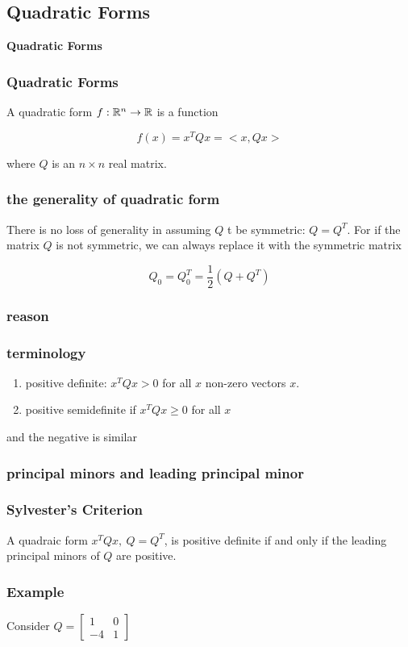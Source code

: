\begin{frame}
	\section{Quadratic Forms}
	\begin{center}
	\textbf{Quadratic Forms}
	\end{center}
\end{frame}

\begin{frame}
	\frametitle{Quadratic Forms}
	A quadratic form $f:\mathbb{R}^n \rightarrow \mathbb{R}$ is a function

	$$f(x) = x^TQx = <x,Qx>$$

	where $Q$ is an $n \times n$ real matrix.
\end{frame}

\begin{frame}
	\frametitle{the generality of quadratic form}
	There is no loss of generality in assuming $Q$ t be symmetric: $Q = Q^T$. For if the matrix $Q$ is not symmetric, we can always replace it with the symmetric matrix

	$$Q_0 = Q_0^T = \dfrac{1}{2}\left( Q + Q^T \right)$$
\end{frame}

\begin{frame}
	\frametitle{reason}
\end{frame}

\begin{frame}
	\frametitle{terminology}
	\begin{enumerate}
	\item positive definite: $x^TQx > 0$ for all $x$ non-zero vectors $x$.
	\item positive semidefinite if $x^TQx \geq 0$ for all $x$
	\end{enumerate}

	and the negative is similar
\end{frame}

\begin{frame}
	\frametitle{principal minors and leading principal minor}
\end{frame}

\begin{frame}
	\frametitle{Sylvester's Criterion}
	A quadraic form $x^TQx,~Q = Q^T$, is positive definite if and only if the leading principal minors of $Q$ are positive.
\end{frame}

\begin{frame}
	\frametitle{Example}

	Consider $Q = \left[ \begin{matrix}
	1 & 0\\
	-4 & 1
	\end{matrix} \right]$
\end{frame}

